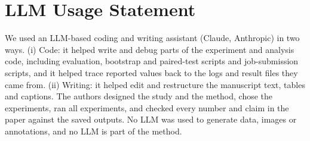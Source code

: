 \section*{LLM Usage Statement}
\label{sec:llm-statement}

We used an LLM-based coding and writing assistant (Claude, Anthropic) in two ways. (i) Code: it helped write and debug parts of the experiment and analysis code, including evaluation, bootstrap and paired-test scripts and job-submission scripts, and it helped trace reported values back to the logs and result files they came from. (ii) Writing: it helped edit and restructure the manuscript text, tables and captions. The authors designed the study and the method, chose the experiments, ran all experiments, and checked every number and claim in the paper against the saved outputs. No LLM was used to generate data, images or annotations, and no LLM is part of the method.
